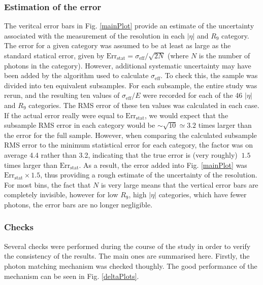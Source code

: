 \documentclass[10pt]{article}
\begin{document}
\subsubsection{Estimation of the error}
The veritcal error bars in Fig. \ref{mainPlot} provide an estimate of the uncertainty associated with the measurement of the resolution in each $|\eta|$ and $R_9$ category. The error for a given category was assumed to be at least as large as the standard statical error, given by $\text{Err}_{\text{stat}} = \sigma_{\text{eff}}/\sqrt{2N}$ (where $N$ is the number of photons in the category). However, additional systematic uncertainty may have been added by the algorithm used to calculate $\sigma_{\text{eff}}$. To check this, the sample was divided into ten equivalent subsamples. For each subsample, the entire study was rerun, and the resulting ten values of $\sigma_{\text{eff}}/E$ were recorded for each of the 46 $|\eta|$ and $R_9$ categories. The RMS error of these ten values was calculated in each case. If the actual error really were equal to $\text{Err}_{\text{stat}}$, we would expect that the subsample RMS error in each category would be $\sim \sqrt{10} \simeq 3.2$ times larger than the error for the full sample. However, when comparing the calculated subsample RMS error to the minimum statistical error for each category, the factor was on average 4.4 rather than 3.2, indicating that the true error is (very roughly) $~1.5$ times larger than $\text{Err}_{\text{stat}} $. As a result, the error added into Fig. \ref{mainPlot} was $\text{Err}_{\text{stat}} \times 1.5$, thus providing a rough estimate of the uncertainty of the resolution. For most bins, the fact that $N$ is very large means that the vertical error bars are completely invisible, however for low $R_9$, high $|\eta|$ categories, which have fewer photons, the error bars are no longer negligible.

\subsubsection{Checks}

Several checks were performed during the course of the study in order to verify the consistency of the results. The main ones are summarised here. Firstly, the photon matching mechanism was checked thoughly. The good performance of the mechanism can be seen in Fig. \ref{deltaPlots}.
\end{document}
